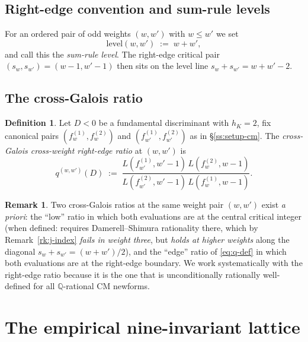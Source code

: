 \documentclass[11pt,a4paper]{amsart}
\theoremstyle{plain}
\theoremstyle{definition}
\newtheorem{definition}[theorem]{Definition}
\newtheorem{remark}[theorem]{Remark}
\newcommand{\Q}{\mathbb{Q}}
\newcommand{\eqdef}{:=}
\newcommand{\fl}[2]{f_{#1}^{(#2)}}
\newcommand{\qstr}[2]{q^{(#1,#2)}}
\begin{document}
\subsection{Right-edge convention and sum-rule levels}

For an ordered pair of odd weights $(w, w')$ with $w \le w'$ we set
\begin{equation}\label{eq:level-def}
   \mathrm{level}(w, w')\;\eqdef\;w + w',
\end{equation}
and call this the \emph{sum-rule level}. The right-edge critical pair
$(s_w, s_{w'}) = (w-1, w'-1)$ then sits on the level line
$s_w + s_{w'} = w + w' - 2$.

\subsection{The cross-Galois ratio}\label{ss:setup-q}

\begin{definition}\label{def:cross-galois}
Let $D < 0$ be a fundamental discriminant with $h_K = 2$, fix canonical pairs
$(\fl{w}{1}, \fl{w}{2})$ and $(\fl{w'}{1}, \fl{w'}{2})$ as in
\S\ref{ss:setup-cm}. The \emph{cross-Galois cross-weight right-edge ratio}
at $(w, w')$ is
\begin{equation}\label{eq:q-def}
   \qstr{w}{w'}(D)
    \;\eqdef\;
    \frac{L(\fl{w'}{1}, w'-1)\,L(\fl{w}{2}, w-1)}
         {L(\fl{w'}{2}, w'-1)\,L(\fl{w}{1}, w-1)}.
\end{equation}
\end{definition}

\begin{remark}\label{rk:two-conventions}
Two cross-Galois ratios at the same weight pair $(w, w')$ exist
\emph{a priori}: the ``low'' ratio in which both evaluations are at the
central critical integer (when defined: requires Damerell--Shimura
rationality there, which by Remark~\ref{rk:j-index} \emph{fails in weight
three}, but \emph{holds at higher weights} along the diagonal
$s_w + s_{w'} = (w+w')/2$), and the ``edge'' ratio of
\eqref{eq:q-def} in which both evaluations are at the right-edge
boundary. We work systematically with the right-edge ratio because it
is the one that is unconditionally rationally well-defined for all
$\Q$-rational CM newforms.
\end{remark}

\section{The empirical nine-invariant lattice}\label{sec:lattice}
\end{document}

